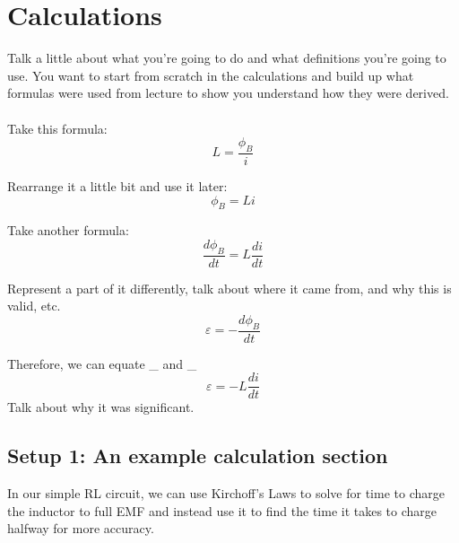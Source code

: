\documentclass[../Lab.tex]{subfiles}
\begin{document}
\section{Calculations}

Talk a little about what you're going to do and what definitions you're going to use. You want to start from scratch in the calculations and build up what formulas were used from lecture to show you understand how they were derived.
\\\\
Take this formula:
\begin{equation}
    L=\frac{\phi_B}{i}
\end{equation}

Rearrange it a little bit and use it later:
\begin{equation}
    \phi_B = Li
\end{equation}

Take another formula:
\begin{equation}
    \frac{d\phi_B}{dt} = L\frac{di}{dt}
    \label{induction}
\end{equation}

Represent a part of it differently, talk about where it came from, and why this is valid, etc.
\begin{equation}
    \varepsilon = -\frac{d\phi_B}{dt}
    \label{faraday_eq}
\end{equation}

Therefore, we can equate \_ and \_
\begin{equation}
    \varepsilon = -L\frac{di}{dt}
\end{equation}
Talk about why it was significant.

\HectorHatesTrees %

\subsection{Setup 1: An example calculation section}

In our simple RL circuit, we can use Kirchoff's Laws to solve for time to charge the inductor to full EMF and instead use it to find the time it takes to charge halfway for more accuracy.
\end{document}
